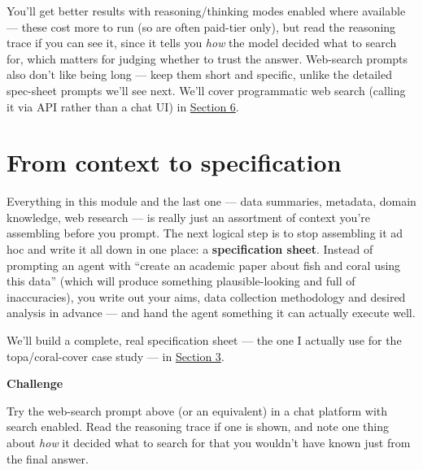 \documentclass[
  letterpaper,
  DIV=11,
  numbers=noendperiod]{scrreprt}
\begin{document}
You'll get better results with reasoning/thinking modes enabled where
available --- these cost more to run (so are often paid-tier only), but
read the reasoning trace if you can see it, since it tells you
\emph{how} the model decided what to search for, which matters for
judging whether to trust the answer. Web-search prompts also don't like
being long --- keep them short and specific, unlike the detailed
spec-sheet prompts we'll see next. We'll cover programmatic web search
(calling it via API rather than a chat UI) in
\href{../section-6-api-access/index.qmd}{Section 6}.

\section{From context to
specification}\label{from-context-to-specification}

Everything in this module and the last one --- data summaries, metadata,
domain knowledge, web research --- is really just an assortment of
context you're assembling before you prompt. The next logical step is to
stop assembling it ad hoc and write it all down in one place: a
\textbf{specification sheet}. Instead of prompting an agent with
``create an academic paper about fish and coral using this data'' (which
will produce something plausible-looking and full of inaccuracies), you
write out your aims, data collection methodology and desired analysis in
advance --- and hand the agent something it can actually execute well.

We'll build a complete, real specification sheet --- the one I actually
use for the topa/coral-cover case study --- in
\href{../section-3-workflows/04-specification-sheets.qmd}{Section 3}.

\begin{tcolorbox}[enhanced jigsaw, toprule=.15mm, rightrule=.15mm, left=2mm, leftrule=.75mm, breakable, opacityback=0, arc=.35mm, colframe=quarto-callout-important-color-frame, bottomrule=.15mm, colback=white]
\begin{minipage}[t]{5.5mm}
\textcolor{quarto-callout-important-color}{\faExclamation}
\end{minipage}%
\begin{minipage}[t]{\textwidth - 5.5mm}

\vspace{-3mm}\textbf{Challenge}\vspace{3mm}

Try the web-search prompt above (or an equivalent) in a chat platform
with search enabled. Read the reasoning trace if one is shown, and note
one thing about \emph{how} it decided what to search for that you
wouldn't have known just from the final answer.

\end{minipage}%
\end{tcolorbox}
\end{document}
